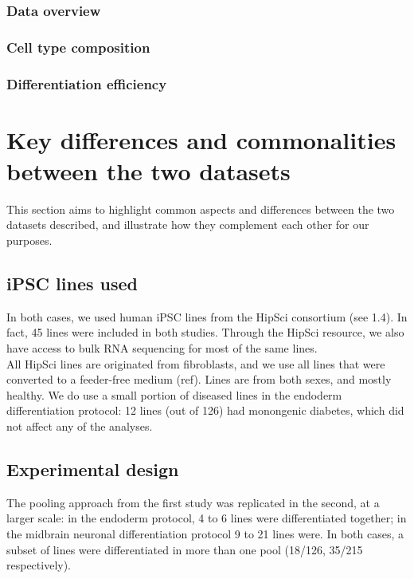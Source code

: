 \subsubsection{Data overview}

\subsubsection{Cell type composition}

\subsubsection{Differentiation efficiency}

\newpage

\section{Key differences and commonalities between the two datasets}

This section aims to highlight common aspects and differences between the two datasets described, and illustrate how they complement each other for our purposes.

\subsection{iPSC lines used}
In both cases, we used human iPSC lines from the HipSci consortium (see 1.4). 
In fact, 45 lines were included in both studies.
Through the HipSci resource, we also have access to bulk RNA sequencing for most of the same lines.\\


All HipSci lines are originated from fibroblasts, and we use all lines that were converted to a feeder-free medium (ref).
Lines are from both sexes, and mostly healthy. 
We do use a small portion of diseased lines in the endoderm differentiation protocol: 12 lines (out of 126) had monongenic diabetes, which did not affect any of the analyses. 

\subsection{Experimental design}
The pooling approach from the first study was replicated in the second, at a larger scale: in the endoderm protocol, 4 to 6 lines were differentiated together; in the midbrain neuronal differentiation protocol 9 to 21 lines were.
In both cases, a subset of lines were differentiated in more than one pool (18/126, 35/215 respectively).\\


